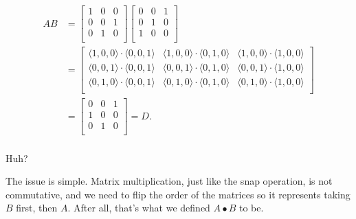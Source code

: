 \documentclass[../gatm_answers.tex]{subfiles}
\begin{document}
\begin{align*}
AB &= \begin{bmatrix}
1 & 0 & 0 \\
0 & 0 & 1 \\
0 & 1 & 0 \\
\end{bmatrix}\begin{bmatrix}
0 & 0 & 1 \\
0 & 1 & 0 \\
1 & 0 & 0 \\
\end{bmatrix} \\
&= \begin{bmatrix}
\langle1,0,0\rangle \cdot \langle0,0,1\rangle & \langle1,0,0\rangle \cdot \langle0,1,0\rangle & \langle1,0,0\rangle \cdot \langle1,0,0\rangle \\
\langle0,0,1\rangle \cdot \langle0,0,1\rangle & \langle0,0,1\rangle \cdot \langle0,1,0\rangle & \langle0,0,1\rangle \cdot \langle1,0,0\rangle \\
\langle0,1,0\rangle \cdot \langle0,0,1\rangle & \langle0,1,0\rangle \cdot \langle0,1,0\rangle & \langle0,1,0\rangle \cdot \langle1,0,0\rangle \\
\end{bmatrix} \\
&= \begin{bmatrix}
0 & 0 & 1 \\
1 & 0 & 0 \\
0 & 1 & 0 \\
\end{bmatrix} = D. \\
\end{align*}

Huh?

The issue is simple. Matrix multiplication, just like the snap operation, is not commutative, and we need to flip the order of the matrices so it represents taking $B$ first, then $A$. After all, that's what we defined $A\bullet B$ to be.
\end{document}

